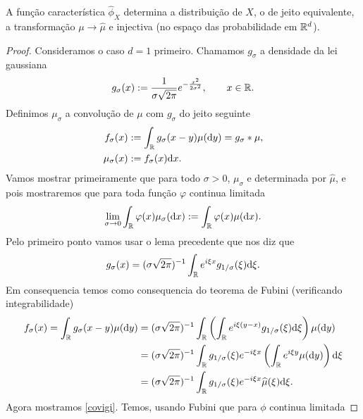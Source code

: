   \begin{theorem}
   A função característica $\hat \phi_X$ determina a distribuição de $X$, o de jeito equivalente, 
   a transformação $\mu \to \hat \mu$ e injectiva (no espaço das probabilidade em ${\mathbb R}^d$).
  \end{theorem}

  \begin{proof}
   Consideramos o caso $d=1$ primeiro. Chamamos $g_{\sigma}$ a densidade da lei gaussiana 
   $$ g_{\sigma}(x):=\frac{1}{\sigma \sqrt{2\pi}} e^{-\frac{x^2}{2\sigma^2}}, \qquad x \in {\ensuremath{\mathbb R}}.$$ 
   Definimos $\mu_{\sigma}$ a convolução de $\mu$ com $g_{\sigma}$ do jeito seguinte 
   \begin{equation}
   \begin{split}
 f_{\sigma}(x)&:= \int_{{\mathbb R}} g_{\sigma}(x-y)\mu(\mathrm{d} y)= g_{\sigma}\ast\mu,\\    
 \mu_{\sigma}(x)&:= f_{\sigma}(x) \mathrm{d} x.   
   \end{split}
 \end{equation}
Vamos mostrar primeiramente que para todo $\sigma>0$,  $\mu_{\sigma}$ e determinada por $\hat \mu$, e pois mostraremos que para 
toda função $\varphi$ continua limitada
   \begin{equation}\label{covigi}
  \lim_{\sigma \to 0} \int_{{\mathbb R}} \varphi(x)\mu_{\sigma}( \mathrm{d} x):= \int_{{\mathbb R}} \varphi(x)\mu( \mathrm{d} x ).
   \end{equation}
Pelo primeiro ponto vamos usar o lema precedente que nos diz que 
\begin{equation}
 g_{\sigma}(x)= (\sigma \sqrt{2\pi})^{-1} \int_{{\mathbb R}} e^{i\xi x} g_{1/\sigma}(\xi) \mathrm{d} \xi.
\end{equation}
Em consequencia temos como consequencia do teorema de Fubini (verificando integrabilidade)
\begin{equation}\begin{split}
 f_{\sigma}(x)= \int_{{\mathbb R}}g_{\sigma}(x-y)\mu(\mathrm{d} y)&= 
 (\sigma \sqrt{2\pi})^{-1} \int_{{\mathbb R}}\left(\int_{{\mathbb R}} e^{i\xi(y-x)} g_{1/\sigma}(\xi)  \mathrm{d} \xi\right) \mu(\mathrm{d} y) \\
 &= (\sigma \sqrt{2\pi})^{-1} \int_{{\mathbb R}} g_{1/\sigma}(\xi) e^{-i\xi x} \left(\int_{{\mathbb R}} e^{i\xi y}  \mu(\mathrm{d} y) \right) \mathrm{d} \xi \\
 &=(\sigma \sqrt{2\pi})^{-1} \int_{{\mathbb R}} g_{1/\sigma}(\xi) e^{-i\xi x} \widehat\mu(\xi) \mathrm{d} \xi.
\end{split}
 \end{equation}
Agora mostramos \eqref{covigi}. Temos, usando Fubini que para $\phi$ continua limitada


\end{proof}
